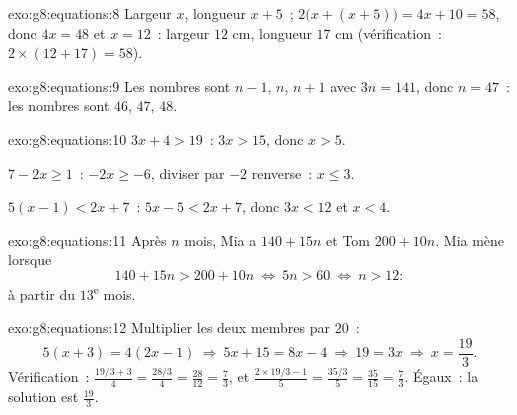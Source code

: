 \begin{solution}{exo:g8:equations:8}
Largeur $x$, longueur $x + 5$~; 
$2\bigl(x + (x + 5)\bigr) = 4x + 10 = 58$, donc $4x = 48$ et
$x = 12$~: largeur $12$ cm, longueur $17$ cm (vérification~:
$2 \times (12 + 17) = 58$).
\end{solution}

\begin{solution}{exo:g8:equations:9}
Les nombres sont $n - 1$, $n$, $n + 1$ avec  $3n = 141$, donc
$n = 47$~: les nombres sont $46$, $47$, $48$.
\end{solution}

\begin{solution}{exo:g8:equations:10}
$3x + 4 > 19$~: $3x > 15$, donc $x > 5$.

$7 - 2x \geq 1$~: $-2x \geq -6$, diviser par $-2$ renverse~:
$x \leq 3$.

$5(x-1) < 2x + 7$~: $5x - 5 < 2x + 7$, donc $3x < 12$ et $x < 4$.
\end{solution}

\begin{solution}{exo:g8:equations:11}
Après $n$ mois, Mia a $140 + 15n$ et Tom $200 + 10n$. Mia mène
lorsque
\[
140 + 15n > 200 + 10n
\ \Longleftrightarrow\
5n > 60
\ \Longleftrightarrow\
n > 12 :
\]
à partir du $13$\textsuperscript{e} mois.
\end{solution}

\begin{solution}{exo:g8:equations:12}
Multiplier les deux membres par $20$~:
\[
5(x + 3) = 4(2x - 1)
\ \Longrightarrow\
5x + 15 = 8x - 4
\ \Longrightarrow\
19 = 3x
\ \Longrightarrow\
x = \frac{19}{3}.
\]
Vérification~: $\frac{19/3 + 3}{4} = \frac{28/3}{4} = \frac{28}{12} =
\frac73$, et $\frac{2 \times 19/3 - 1}{5} = \frac{35/3}{5} =
\frac{35}{15} = \frac73$. Égaux~: la solution est $\frac{19}{3}$.
\end{solution}

